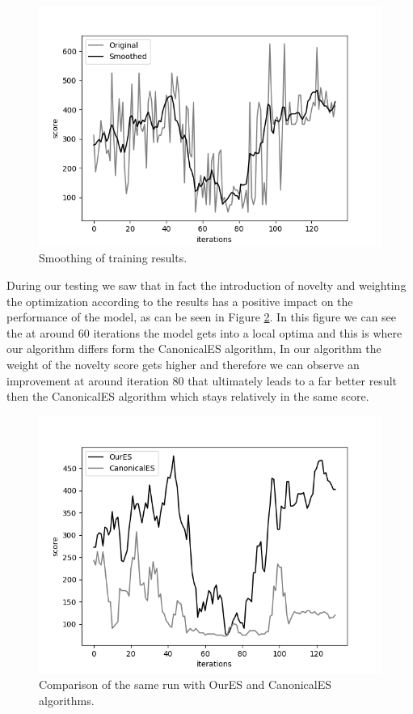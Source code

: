 \documentclass[11 pt, twocolumn]{article}
\begin{document}
\begin{figure}[h!]
  \includegraphics[width=\linewidth]{QbertNoiseComparison.png}
  \caption{Smoothing of training results.}
  \label{fig:noise_comp}
\end{figure}

During our testing we saw that in fact the introduction of novelty and weighting the optimization according to the results has a positive impact on the performance of the model, as can be seen in Figure \ref{fig:comp_res}. In this figure we can see the at around 60 iterations the model gets into a local optima and this is where our algorithm differs form the CanonicalES algorithm, In our algorithm the weight of the novelty score gets higher and therefore we can observe an improvement at around iteration 80 that ultimately leads to a far better result then the CanonicalES algorithm which stays relatively in the same score.

\begin{figure}[h!]
  \includegraphics[width=\linewidth]{QbertComparison.png}
  \caption{Comparison of the same run with OurES and CanonicalES algorithms.}
  \label{fig:comp_res}
\end{figure}
\end{document}

